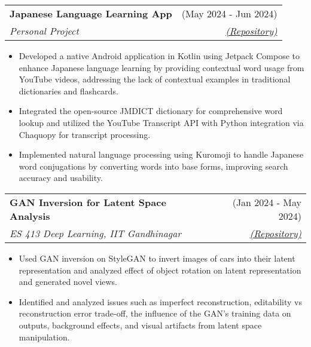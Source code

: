 \documentclass[a4paper,10pt]{report}
\makeatletter
\newcommand{\resumeSubheading}[4]{
  \vspace{-1pt}\item
    \begin{tabular*}{0.97\textwidth}[t]{l@{\extracolsep{\fill}}r}
      \textbf{#1} & #2 \\
      \textit{\small#3} & \textit{\small #4} \\
    \end{tabular*}\vspace{-6pt}
}
\makeatother
\begin{document}
\vspace{-6pt}

    \resumeSubheading
      {Japanese Language Learning App}{(May 2024 - Jun 2024)}{Personal Project}
      {\textcolor{lightblue}{\href{https://github.com/Utkarsh-Mishra444/Immerse}{(Repository)}}}{}
       \begin{itemize}
        \item Developed a native Android application in Kotlin using Jetpack Compose to enhance Japanese language learning by providing contextual word usage from YouTube videos, addressing the lack of contextual examples in traditional dictionaries and flashcards.
        \vspace{-2pt}
        \item Integrated the open-source JMDICT dictionary for comprehensive word lookup and utilized the YouTube Transcript API with Python integration via Chaquopy for transcript processing. \\
        \vspace{-2pt}
        \item Implemented natural language processing using Kuromoji to handle Japanese word conjugations by converting words into base forms, improving search accuracy and usability. 
     \end{itemize}


\vspace{-6pt}

    \resumeSubheading
      {GAN Inversion for Latent Space Analysis}{(Jan 2024 - May 2024)}{ES 413 Deep Learning, IIT Gandhinagar}
      {\textcolor{lightblue}{\href{https://github.com/Utkarsh-Mishra444/Gan-Inversion}{(Repository)}}}{}
       \begin{itemize}
        \item Used GAN inversion on StyleGAN to invert images of cars into their latent representation and analyzed effect of object rotation on latent representation and generated novel views. 
        \vspace{-2pt}
        \item Identified and analyzed issues such as imperfect reconstruction, editability vs reconstruction error trade-off, the influence of the GAN's training data on outputs, background effects, and visual artifacts from latent space manipulation.

     \end{itemize}
\end{document}
